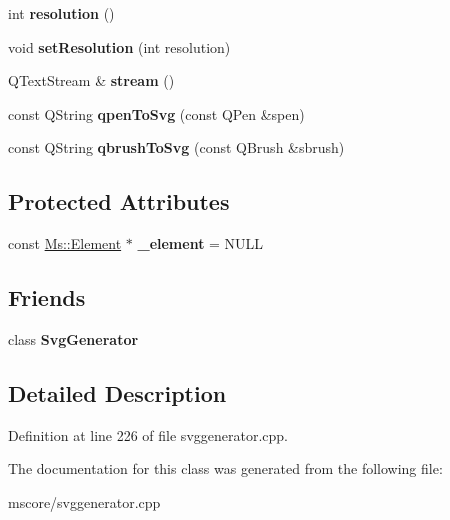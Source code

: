 \begin{DoxyCompactItemize}
int {\bfseries resolution} ()
\item 
\mbox{\label{class_svg_paint_engine_adc242ed4a07026158a8b779d7883dc91}} 
void {\bfseries set\+Resolution} (int resolution)
\item 
\mbox{\label{class_svg_paint_engine_a574e960e166f59eba61c3ae5204f5010}} 
Q\+Text\+Stream \& {\bfseries stream} ()
\item 
\mbox{\label{class_svg_paint_engine_a58e96f7fb6e336f9c7de8463409421f3}} 
const Q\+String {\bfseries qpen\+To\+Svg} (const Q\+Pen \&spen)
\item 
\mbox{\label{class_svg_paint_engine_a1cac3b266f565060b0891152521b86f0}} 
const Q\+String {\bfseries qbrush\+To\+Svg} (const Q\+Brush \&sbrush)
\end{DoxyCompactItemize}
\subsection*{Protected Attributes}
\begin{DoxyCompactItemize}
\item 
\mbox{\label{class_svg_paint_engine_a53c8144586867b7819874b7d260894c9}} 
const \hyperlink{class_ms_1_1_element}{Ms\+::\+Element} $\ast$ {\bfseries \+\_\+element} = N\+U\+LL
\end{DoxyCompactItemize}
\subsection*{Friends}
\begin{DoxyCompactItemize}
\item 
\mbox{\label{class_svg_paint_engine_aef20980cfa801ec1158d9af75b421385}} 
class {\bfseries Svg\+Generator}
\end{DoxyCompactItemize}


\subsection{Detailed Description}


Definition at line 226 of file svggenerator.\+cpp.



The documentation for this class was generated from the following file\+:\begin{DoxyCompactItemize}
\item 
mscore/svggenerator.\+cpp\end{DoxyCompactItemize}
